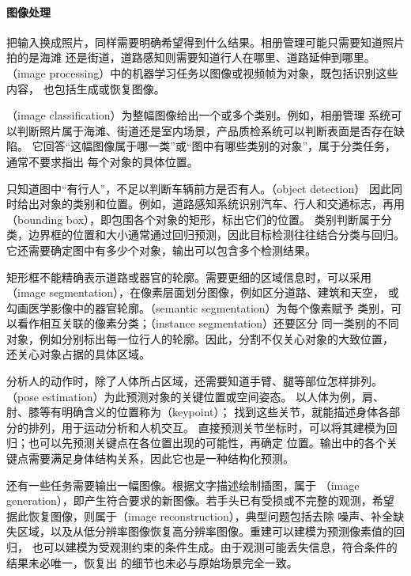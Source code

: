 \paragraph{图像处理}
把输入换成照片，同样需要明确希望得到什么结果。相册管理可能只需要知道照片拍的是海滩
还是街道，道路感知则需要知道行人在哪里、道路延伸到哪里。
（image processing）中的机器学习任务以图像或视频帧为对象，既包括识别这些内容，
也包括生成或恢复图像。

（image classification）为整幅图像给出一个或多个类别。例如，相册管理
系统可以判断照片属于海滩、街道还是室内场景，产品质检系统可以判断表面是否存在缺陷。
它回答“这幅图像属于哪一类”或“图中有哪些类别的对象”，属于分类任务，通常不要求指出
每个对象的具体位置。

只知道图中“有行人”，不足以判断车辆前方是否有人。（object detection）
因此同时给出对象的类别和位置。例如，道路感知系统识别汽车、行人和交通标志，再用
（bounding box），即包围各个对象的矩形，标出它们的位置。
类别判断属于分类，边界框的位置和大小通常通过回归预测，因此目标检测往往结合分类与回归。
它还需要确定图中有多少个对象，输出可以包含多个检测结果。

矩形框不能精确表示道路或器官的轮廓。需要更细的区域信息时，可以采用
（image segmentation），在像素层面划分图像，例如区分道路、建筑和天空，
或勾画医学影像中的器官轮廓。（semantic segmentation）为每个像素赋予
类别，可以看作相互关联的像素分类；（instance segmentation）还要区分
同一类别的不同对象，例如分别标出每一位行人的轮廓。因此，分割不仅关心对象的大致位置，
还关心对象占据的具体区域。

分析人的动作时，除了人体所占区域，还需要知道手臂、腿等部位怎样排列。
（pose estimation）为此预测对象的关键位置或空间姿态。
以人体为例，肩、肘、膝等有明确含义的位置称为（keypoint）；
找到这些关节，就能描述身体各部分的排列，用于运动分析和人机交互。
直接预测关节坐标时，可以将其建模为回归；也可以先预测关键点在各位置出现的可能性，再确定
位置。输出中的各个关键点需要满足身体结构关系，因此它也是一种结构化预测。

还有一些任务需要输出一幅图像。根据文字描述绘制插图，属于
（image generation），即产生符合要求的新图像。若手头已有受损或不完整的观测，希望
据此恢复图像，则属于（image reconstruction），典型问题包括去除
噪声、补全缺失区域，以及从低分辨率图像恢复高分辨率图像。重建可以建模为预测像素值的回归，
也可以建模为受观测约束的条件生成。由于观测可能丢失信息，符合条件的结果未必唯一，恢复出
的细节也未必与原始场景完全一致。

